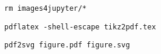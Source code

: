 \documentclass{scrartcl}
\begin{document}



\texttt{rm images4jupyter/*}

\texttt{pdflatex -shell-escape tikz2pdf.tex}

\texttt{pdf2svg figure.pdf figure.svg}
\end{document}
